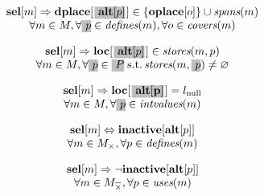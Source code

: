 \begin{equation}
  \begin{array}{c}
    \mVar{sel}[m]
    \mImp
    \mVar{dplace}[\hlDiff{\mVar{alt}[p]}[1pt]] \in
      \mSet{\mVar{oplace}[o]} \cup \mSpans(m) \\
    \forall m \in \mMatchSet,
    \forall \hlDiff{p} \in \mDefines(m),
    \forall o \in \mCovers(m)
  \end{array}
  \labelEquation{spanning}
\end{equation}

\begin{equation}
  \begin{array}{c}
    \mVar{sel}[m]
    \mImp
    \mVar{loc}[\hlDiff{\mVar{alt}[p]}[1pt]] \in \mStores(m, p) \\
    \forall m \in \mMatchSet,
    \forall \hlDiff{p} \in
      \hlDiff{\mOperandSet} \;\text{s.t.}
      \mStores(m, \hlDiff{p}) \neq \mEmptySet
  \end{array}
  \labelEquation{valid-locations}
\end{equation}

\begin{equation}
  \begin{array}{c}
    \mVar{sel}[m]
    \mImp
    \mVar{loc}[\hlDiff{\mVar{alt[p]}}[1pt]] = \mNullLocation \\
    \forall m \in \mMatchSet,
    \forall \hlDiff{p} \in \mIntValues(m)
  \end{array}
  \labelEquation{locs-of-intermediate-values}
\end{equation}

\begin{equation}
  \begin{array}{c}
    \mVar{sel}[m]
    \mEq
    \mVar{inactive}[\mVar{alt}[p]] \\
    \forall m \in \mMatchSet[\mKill],
    \forall p \in \mDefines(m)
  \end{array}
  \labelEquation{inactivity-when-killed}
\end{equation}

\begin{equation}
  \begin{array}{c}
    \mVar{sel}[m]
    \mImp
    \neg \mVar{inactive}[\mVar{alt}[p]] \\
    \forall m \in \mMatchCompSet{\mKill},
    \forall p \in \mUses(m)
  \end{array}
  \labelEquation{inactivity-when-used}
\end{equation}

